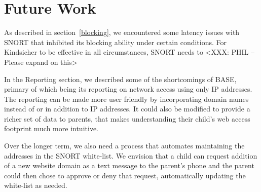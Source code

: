 \section{Future Work}

As described in section~\ref{blocking}, we encountered some latency issues with
SNORT that inhibited its blocking ability under certain conditions. For
Kindsicher to be effective in all circumstances, SNORT needs to <XXX: PHIL –
Please expand on this>

In the Reporting section, we described some of the shortcomings of BASE,
primary of which being its reporting on network access using only IP addresses.
The reporting can be made more user friendly by incorporating domain names
instead of or in addition to IP addresses. It could also be modified to provide
a richer set of data to parents, that makes understanding their child's web
access footprint much more intuitive.

Over the longer term, we also need a process that automates maintaining the
addresses in the SNORT white-list. We envision that a child can request
addition of a new website domain as a text message to the parent's phone and
the parent could then chose to approve or deny that request, automatically
updating the white-list as needed.
